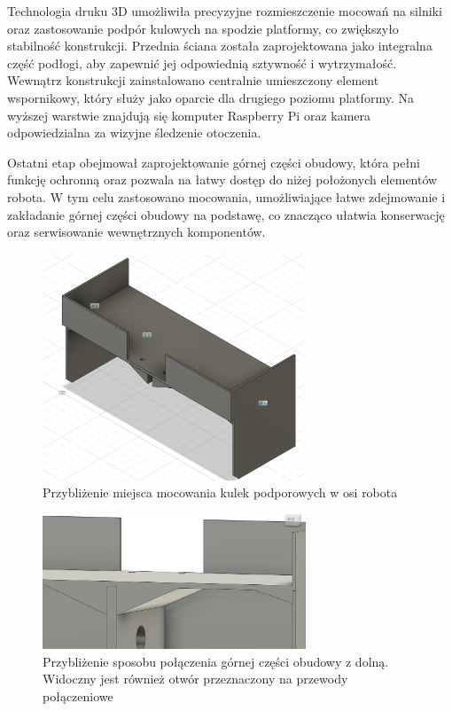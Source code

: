 Technologia druku 3D umożliwiła precyzyjne rozmieszczenie mocowań na silniki oraz zastosowanie podpór kulowych na spodzie platformy, co zwiększyło stabilność konstrukcji. Przednia ściana została zaprojektowana jako integralna część podłogi, aby zapewnić jej odpowiednią sztywność i wytrzymałość. Wewnątrz konstrukcji zainstalowano centralnie umieszczony element wspornikowy, który służy jako oparcie dla drugiego poziomu platformy. Na wyższej warstwie znajdują się komputer Raspberry Pi oraz kamera odpowiedzialna za wizyjne śledzenie otoczenia.

Ostatni etap obejmował zaprojektowanie górnej części obudowy, która pełni funkcję ochronną oraz pozwala na łatwy dostęp do niżej położonych elementów robota. W tym celu zastosowano mocowania, umożliwiające łatwe zdejmowanie i zakładanie górnej części obudowy na podstawę, co znacząco ułatwia konserwację oraz serwisowanie wewnętrznych komponentów.

\begin{figure}[H]
  \centering
  \includegraphics[width=0.7\textwidth]{./graf/upper.png}
  \caption{Przybliżenie miejsca mocowania kulek podporowych w osi robota}
  \label{fig:ball-close}
\end{figure}

\begin{figure}[H]
  \centering
  \includegraphics[width=0.7\textwidth]{./graf/full-close.png}
  \caption{Przybliżenie sposobu połączenia górnej części obudowy z dolną. Widoczny jest również otwór przeznaczony na przewody połączeniowe}
  \label{fig:full-close}
\end{figure}

